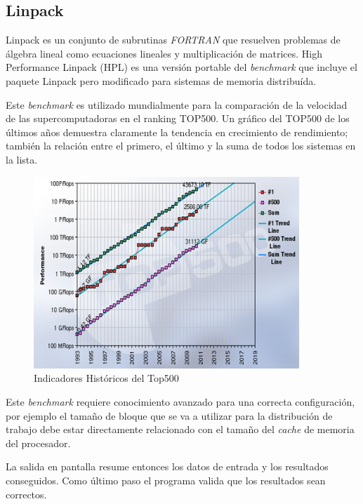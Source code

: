 \documentclass[a4paper]{report}
\begin{document}
\subsection{Linpack}

Linpack \cite{linpack} es un conjunto de subrutinas {\it FORTRAN} que resuelven
problemas de \'algebra lineal como ecuaciones lineales y multiplicaci\'on de
matrices. High Performance Linpack (HPL) \cite{hpl} es una versi\'on portable del {\it benchmark} que incluye
el paquete Linpack pero modificado para sistemas de memoria distribu\'ida.

\bigskip

Este {\it benchmark} es utilizado mundialmente para la comparaci\'on de la
velocidad de las supercomputadoras en el ranking TOP500. 
Un gr\'afico del TOP500 de los \'ultimos a\~nos demuestra claramente la
tendencia en crecimiento de rendimiento; tambi\'en la relaci\'on entre el primero,
el \'ultimo y la suma de todos los sistemas en la lista.

\begin{figure}[H]
\begin{center}
\includegraphics[width=10cm]{top500.png}
\caption{Indicadores Hist\'oricos del Top500}
\end{center}
\end{figure}

Este {\it benchmark} requiere conocimiento avanzado para una correcta configuraci\'on,
por ejemplo el tama\~no de bloque que se va a utilizar para la distribuci\'on de trabajo
debe estar directamente relacionado con el tama\~no del {\it cache} de memoria del procesador.

\bigskip

La salida en pantalla resume entonces los datos de entrada y los resultados conseguidos.
Como \'ultimo paso el programa valida que los resultados sean correctos.
\end{document}

